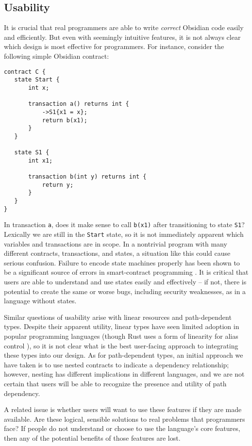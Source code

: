 \documentclass[sigplan,10pt,review]{acmart}\settopmatter{printfolios=true}
\begin{document}
\subsection{Usability}
It is crucial that real programmers are able to write \textit{correct} Obsidian 
code easily and efficiently. But even with seemingly intuitive features, it is not always clear 
which design is most effective for programmers. For instance, consider the following simple 
Obsidian contract:

\begin{lstlisting}
contract C {
   state Start {
       int x;
  
       transaction a() returns int {
           ->S1{x1 = x};
           return b(x1);
       }
   }
  
   state S1 {
       int x1;
      
       transaction b(int y) returns int {
           return y;
       }
   }
}
\end{lstlisting}

In transaction \texttt{\small{a}}, does it make sense to call \texttt{\small{b(x1)}} after transitioning 
to state \texttt{\small{S1}}? Lexically we are still in the 
\texttt{\small{Start}} state, so it is not immediately apparent which variables and transactions are in scope. 
In a nontrivial program with many different contracts, 
transactions, and states, a situation like this could cause serious confusion. Failure to encode state 
machines properly has been shown to be a significant source of errors in smart-contract 
programming \cite{Delmolino}. It is critical that users are able to understand and use states easily and 
effectively -- if not, there is potential to create the same or worse bugs, including security weaknesses, as in a 
language without states. 

Similar questions of usability arise with linear resources and path-dependent types. 
Despite their apparent utility, linear types have seen limited adoption in popular programming languages (though 
Rust uses a form of linearity for alias control \cite{Rust}), so it is not clear what is the best user-facing
approach to integrating these types into our design. As for path-dependent types, an initial approach we have 
taken is to use nested contracts to indicate a dependency relationship; however, nesting has different 
implications in different languages, and we are not certain that users will be able to recognize the 
presence and utility of path dependency. 

A related issue is whether users will want to use these features if they are made available. Are 
these logical, sensible solutions to real problems that programmers face? If people do not 
understand or choose to use the language's core features, then any of the potential benefits 
of those features are lost. 
\end{document}
